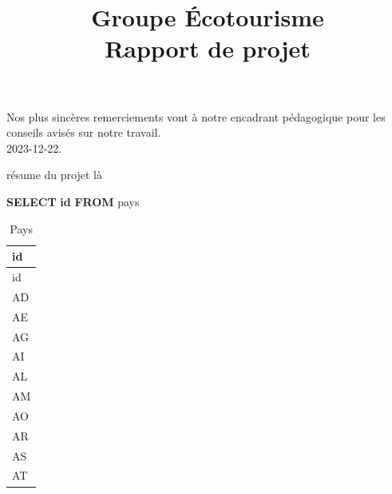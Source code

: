 \documentclass[mstat,12pt]{unswthesis}
\title{Groupe Écotourisme\\[0.5cm]Rapport de projet}
\author{\Authornameonly}
\newenvironment{Shaded}{\begin{snugshade}}{\end{snugshade}}
\newcommand{\KeywordTok}[1]{\textcolor[rgb]{0.13,0.29,0.53}{\textbf{#1}}}
\newcommand{\NormalTok}[1]{#1}
\begin{document}
\begin{adjustwidth}{-2cm}{}

\beforepreface






{\bigskip}Nos plus sincères remerciements vont à notre encadrant
pédagogique pour les conseils avisés sur notre travail.\\[1cm] 

{\bigskip\bigskip\bigskip\noindent} 2023-12-22.




résume du projet là



\afterpreface





%
%






\begin{Shaded}
\begin{Highlighting}[]
\KeywordTok{SELECT} \KeywordTok{id}
\KeywordTok{FROM}\NormalTok{ pays}
\end{Highlighting}
\end{Shaded}

\begin{longtable}[]{@{}l@{}}
\caption{Pays}\tabularnewline
\toprule\noalign{}
id \\
\midrule\noalign{}
\endfirsthead
\toprule\noalign{}
id \\
\midrule\noalign{}
\endhead
\bottomrule\noalign{}
\endlastfoot
AD \\
AE \\
AG \\
AI \\
AL \\
AM \\
AO \\
AR \\
AS \\
AT \\
\end{longtable}


\end{adjustwidth}
\end{document}

